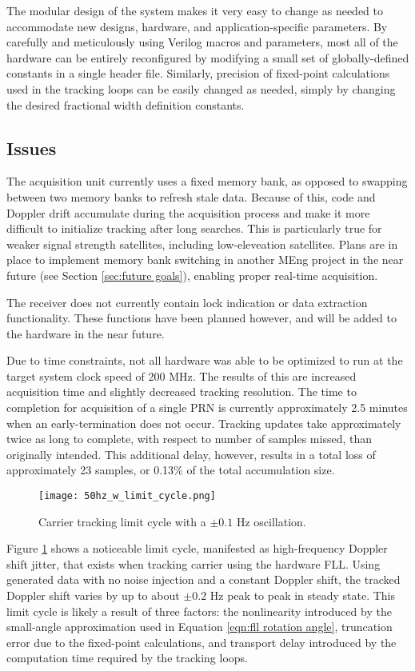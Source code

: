 \documentclass[12pt]{article}
\begin{document}
The modular design of the system makes it very easy to change as needed to accommodate new designs, hardware, and application-specific parameters. By carefully and meticulously using Verilog macros and parameters, most all of the hardware can be entirely reconfigured by modifying a small set of globally-defined constants in a single header file. Similarly, precision of fixed-point calculations used in the tracking loops can be easily changed as needed, simply by changing the desired fractional width definition constants.

\subsection{Issues}
The acquisition unit currently uses a fixed memory bank, as opposed to swapping between two memory banks to refresh stale data. Because of this, code and Doppler drift accumulate during the acquisition process and make it more difficult to initialize tracking after long searches. This is particularly true for weaker signal strength satellites, including low-eleveation satellites. Plans are in place to implement memory bank switching in another MEng project in the near future (see Section \ref{sec:future goals}), enabling proper real-time acquisition.

The receiver does not currently contain lock indication or data extraction functionality. These functions have been planned however, and will be added to the hardware in the near future.

Due to time constraints, not all hardware was able to be optimized to run at the target system clock speed of 200 MHz. The results of this are increased acquisition time and slightly decreased tracking resolution. The time to completion for acquisition of a single PRN is currently approximately 2.5 minutes when an early-termination does not occur. Tracking updates take approximately twice as long to complete, with respect to number of samples missed, than originally intended. This additional delay, however, results in a total loss of approximately 23 samples, or 0.13\% of the total accumulation size.

\begin{figure}
\centering
\texttt{[image: 50hz\_w\_limit\_cycle.png]}
\caption{Carrier tracking limit cycle with a $\pm 0.1$ Hz oscillation.}
\label{img:limit cycle}
\end{figure}

Figure \ref{img:limit cycle} shows a noticeable limit cycle, manifested as high-frequency Doppler shift jitter, that exists when tracking carrier using the hardware FLL. Using generated data with no noise injection and a constant Doppler shift, the tracked Doppler shift varies by up to about $\pm 0.2$ Hz peak to peak in steady state. This limit cycle is likely a result of three factors: the nonlinearity introduced by the small-angle approximation used in Equation \ref{eqn:fll rotation angle}, truncation error due to the fixed-point calculations, and transport delay introduced by the computation time required by the tracking loops.
\end{document}
